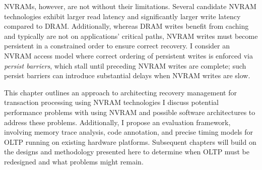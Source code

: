 NVRAMs, however, are not without their limitations.
Se\-veral candidate NVRAM technologies exhibit larger read latency and significantly larger write latency compared to DRAM.
Additionally, whereas DRAM writes benefit from caching and typically are not on applications' critical paths, NVRAM writes must become persistent in a constrained order to ensure correct recovery.
I consider an NVRAM access model where correct ordering of persistent writes is enforced via \emph{persist barriers}, which stall until preceding NVRAM writes are complete; such persist barriers can introduce substantial delays when NVRAM writes are slow.

This chapter outlines an approach to architecting recovery management for transaction processing using NVRAM technologies
I discuss potential performance problems with using NVRAM and possible software architectures to address these problems.
Additionally, I propose an evaluation framework, involving memory trace analysis, code annotation, and precise timing models for OLTP running on existing hardware platforms.
Subsequent chapters will build on the designs and methodology presented here to determine when OLTP must be redesigned and what problems might remain.
